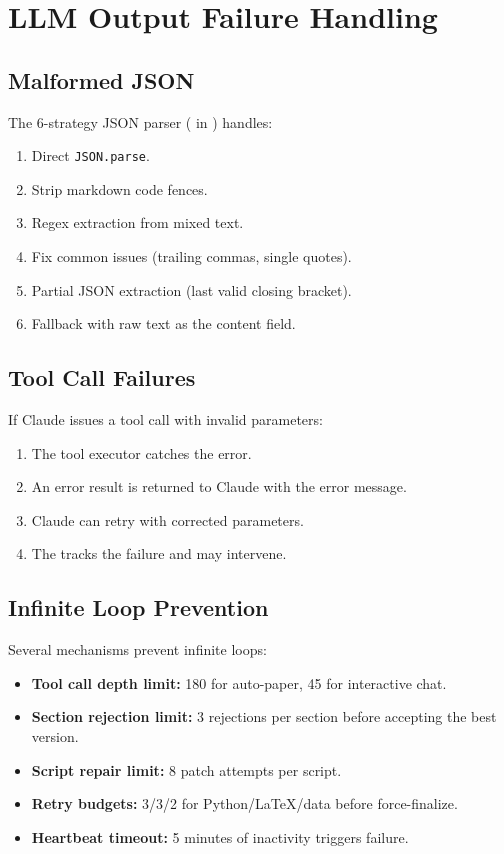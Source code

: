 \section{LLM Output Failure Handling}
\label{sec:failure:llm}

\subsection{Malformed JSON}

The 6-strategy JSON parser ( in ) handles:

\begin{enumerate}
  \item Direct \texttt{JSON.parse}.
  \item Strip markdown code fences.
  \item Regex extraction from mixed text.
  \item Fix common issues (trailing commas, single quotes).
  \item Partial JSON extraction (last valid closing bracket).
  \item Fallback with raw text as the content field.
\end{enumerate}

\subsection{Tool Call Failures}

If Claude issues a tool call with invalid parameters:
\begin{enumerate}
  \item The tool executor catches the error.
  \item An error result is returned to Claude with the error message.
  \item Claude can retry with corrected parameters.
  \item The \governor tracks the failure and may intervene.
\end{enumerate}

\subsection{Infinite Loop Prevention}

Several mechanisms prevent infinite loops:
\begin{itemize}
  \item \textbf{Tool call depth limit:} 180 for auto-paper, 45 for interactive chat.
  \item \textbf{Section rejection limit:} 3 rejections per section before accepting the best version.
  \item \textbf{Script repair limit:} 8 patch attempts per script.
  \item \textbf{Retry budgets:} 3/3/2 for Python/\LaTeX{}/data before force-finalize.
  \item \textbf{Heartbeat timeout:} 5 minutes of inactivity triggers failure.
\end{itemize}

